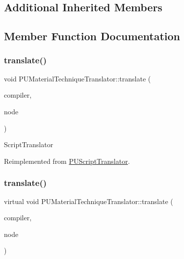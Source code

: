 \subsection*{Additional Inherited Members}


\subsection{Member Function Documentation}
\mbox{\label{classPUMaterialTechniqueTranslator_aef390e290eec8a53e8d5e4d7ff38c21e}} 
\subsubsection{\texorpdfstring{translate()}{translate()}\hspace{0.1cm}{\footnotesize\ttfamily [1/2]}}
{\footnotesize\ttfamily void P\+U\+Material\+Technique\+Translator\+::translate (\begin{DoxyParamCaption}\item[{\hyperlink{classPUScriptCompiler}{P\+U\+Script\+Compiler} $\ast$}]{compiler,  }\item[{\hyperlink{classPUAbstractNode}{P\+U\+Abstract\+Node} $\ast$}]{node }\end{DoxyParamCaption})\hspace{0.3cm}{\ttfamily [virtual]}}

Script\+Translator 

Reimplemented from \hyperlink{classPUScriptTranslator_a9ff2cdfda9ea8db6fd716e7b69dbe79b}{P\+U\+Script\+Translator}.

\mbox{\label{classPUMaterialTechniqueTranslator_ad104280e70098856848f9383b4c6274d}} 
\subsubsection{\texorpdfstring{translate()}{translate()}\hspace{0.1cm}{\footnotesize\ttfamily [2/2]}}
{\footnotesize\ttfamily virtual void P\+U\+Material\+Technique\+Translator\+::translate (\begin{DoxyParamCaption}\item[{\hyperlink{classPUScriptCompiler}{P\+U\+Script\+Compiler} $\ast$}]{compiler,  }\item[{\hyperlink{classPUAbstractNode}{P\+U\+Abstract\+Node} $\ast$}]{node }\end{DoxyParamCaption})\hspace{0.3cm}{\ttfamily [virtual]}}

